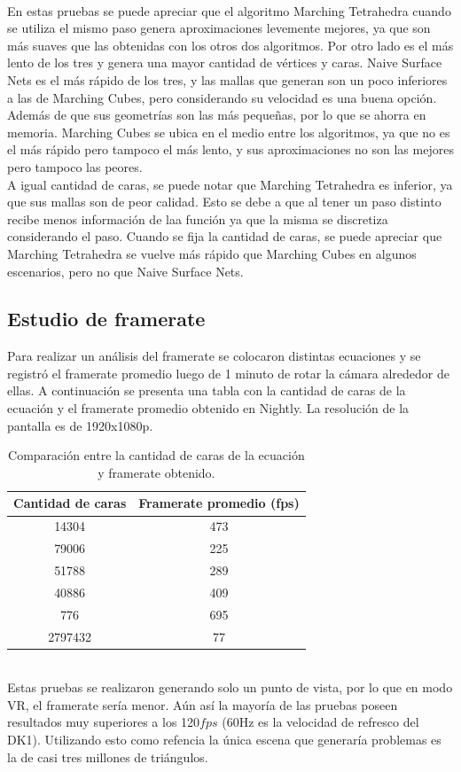 \documentclass[12pt]{article}
\begin{document}
\\En estas pruebas se puede apreciar que el algoritmo Marching Tetrahedra cuando se utiliza el mismo paso genera aproximaciones levemente mejores, ya que son más suaves que las obtenidas con los otros dos algoritmos. Por otro lado es el más lento de los tres y genera una mayor cantidad de vértices y caras. Naive Surface Nets es el más rápido de los tres, y las mallas que generan son un poco inferiores a las de Marching Cubes, pero considerando su velocidad es una buena opción. Además de que sus geometrías son las más pequeñas, por lo que se ahorra en memoria. Marching Cubes se ubica en el medio entre los algoritmos, ya que no es el más rápido pero tampoco el más lento, y sus aproximaciones no son las mejores pero tampoco las peores.
\\ A igual cantidad de caras, se puede notar que Marching Tetrahedra es inferior, ya que sus mallas son de peor calidad. Esto se debe a que al tener un paso distinto recibe menos información de laa función ya que la misma se discretiza considerando el paso. Cuando se fija la cantidad de caras, se puede apreciar que Marching Tetrahedra se vuelve más rápido que Marching Cubes en algunos escenarios, pero no que Naive Surface Nets.

\subsection{ Estudio de framerate}
Para realizar un análisis del framerate se colocaron distintas ecuaciones y se registró el framerate promedio luego de 1 minuto de rotar la cámara alrededor de ellas. A continuación se presenta una tabla con la cantidad de caras de la ecuación y el framerate promedio obtenido en Nightly. La resolución de la pantalla es de 1920x1080p.
\begin{table}[h!]
  \centering
  \label{tab:table1}
  \begin{tabular}{cc}
    \toprule
    Cantidad de caras & Framerate promedio (fps)\\
    \midrule
    14304 & 473\\
    79006 & 225\\
    51788 & 289\\
    40886&409\\
    776&695\\
    2797432&77\\
    \bottomrule
  \end{tabular}
  \caption{Comparación entre la cantidad de caras de la ecuación y framerate obtenido.}
\end{table}
\\Estas pruebas se realizaron generando solo un punto de vista, por lo que en modo VR, el framerate sería menor. Aún así la mayoría de las pruebas poseen resultados muy superiores a los 120$fps$ (60Hz es la velocidad de refresco del DK1). Utilizando esto como refencia la única escena que generaría problemas es la de casi tres millones de triángulos.
\end{document}
